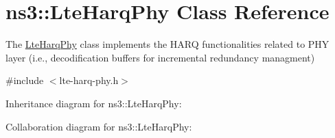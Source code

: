 \hypertarget{classns3_1_1LteHarqPhy}{}\section{ns3\+:\+:Lte\+Harq\+Phy Class Reference}
\label{classns3_1_1LteHarqPhy}


The \hyperlink{classns3_1_1LteHarqPhy}{Lte\+Harq\+Phy} class implements the H\+A\+RQ functionalities related to P\+HY layer (i.\+e., decodification buffers for incremental redundancy managment)  




{\ttfamily \#include $<$lte-\/harq-\/phy.\+h$>$}



Inheritance diagram for ns3\+:\+:Lte\+Harq\+Phy\+:


Collaboration diagram for ns3\+:\+:Lte\+Harq\+Phy\+:
